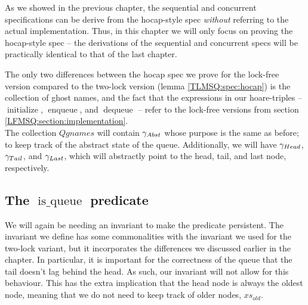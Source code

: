 \documentclass[twoside,11pt,openright]{report}
\newcommand{\initialise}{\operatorname{initialize}}
\newcommand{\enqueue}{\operatorname{enqueue}}
\newcommand{\dequeue}{\operatorname{dequeue}}
\newcommand{\isqueue}{\operatorname{is\_queue}}
\begin{document}
As we showed in the previous chapter, the sequential and concurrent specifications can be derive from the hocap-style spec \emph{without} referring to the actual implementation. Thus, in this chapter we will only focus on proving the hocap-style spec -- the derivations of the sequential and concurrent specs will be practically identical to that of the last chapter.

The only two differences between the hocap spec we prove for the lock-free version compared to the two-lock version (lemma \ref{TLMSQ:spec:hocap}) is the collection of ghost names, and the fact that the expressions in our hoare-triples -- $\initialise$, $\enqueue$, and $\dequeue$ -- refer to the lock-free versions from section \ref{LFMSQ:section:implementation}.\\
The collection $Qgnames$ will contain $\gamma_{Abst}$ whose purpose is the same as before; to keep track of the abstract state of the queue. Additionally, we will have $\gamma_{Head}$, $\gamma_{Tail}$, and $\gamma_{Last}$, which will abstractly point to the head, tail, and last node, respectively. 

\subsection[The isqueue predicate]{The $\isqueue$ predicate}

We will again be needing an invariant to make the predicate persistent. The invariant we define has some commonalities with the invariant we used for the two-lock variant, but it incorporates the differences we discussed earlier in the chapter. In particular, it is important for the correctness of the queue that the tail doesn't lag behind the head. As such, our invariant will not allow for this behaviour. This has the extra implication that the head node is always the oldest node, meaning that we do not need to keep track of older nodes, $xs_{old}$.
\end{document}
